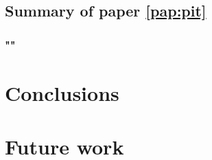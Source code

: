 \section{Summary of paper \ref{pap:pit}}
\subsection*{""}

\chapter{Conclusions\label{ch:conclusions}}


\chapter{Future work\label{ch:future_work}}
